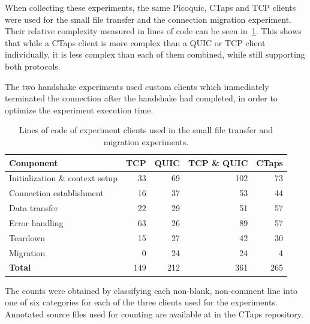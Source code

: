When collecting these experiments, the same Picoquic, CTaps and TCP clients
were used for the small file transfer and the connection migration experiment.
Their relative complexity measured in lines of code
can be seen in~\cref{tab:loc_complexity}. This
shows that while a CTaps client is more complex than a QUIC or TCP client
individually, it is less complex than each of them combined, while
still supporting both protocols.

The two handshake experiments used custom clients which immediately
terminated the connection after the handshake had completed, in order
to optimize the experiment execution time.

\begin{table}[htbp]
\centering
\begin{threeparttable}
    \caption[Lines of code for experiment clients]{Lines of code of experiment clients used in the small file transfer and migration experiments.}
\label{tab:loc_complexity}
\begin{tabular}{lrrrr}
\toprule
\rowcolor{gray!25}
\textbf{Component} & \textbf{TCP} & \textbf{QUIC} & \textbf{TCP \& QUIC} & \textbf{CTaps} \\
\midrule
\multicolumn{1}{l||}{Initialization \& context setup}  & 33  &  69 & 102  & 73  \\
\multicolumn{1}{l||}{Connection establishment}         & 16  &  37 &  53  & 44  \\
\multicolumn{1}{l||}{Data transfer}                    & 22  &  29 &  51  & 57  \\
\multicolumn{1}{l||}{Error handling}                   & 63  &  26 &  89  & 57  \\
\multicolumn{1}{l||}{Teardown}                         & 15  &  27 &  42  & 30  \\
\multicolumn{1}{l||}{Migration}                        &  0  &  24 &  24  &  4  \\
\midrule
\textbf{Total}                   & 149 & 212 & 361 & 265 \\
\bottomrule
\end{tabular}
\begin{tablenotes}
      \footnotesize
      \item[1] The counts were obtained by classifying each non-blank,
non-comment line into one of six categories
for each of the three clients used for the experiments.
Annotated source files used for counting are available at  in the CTaps repository.
    \end{tablenotes}
\end{threeparttable}
\end{table}

